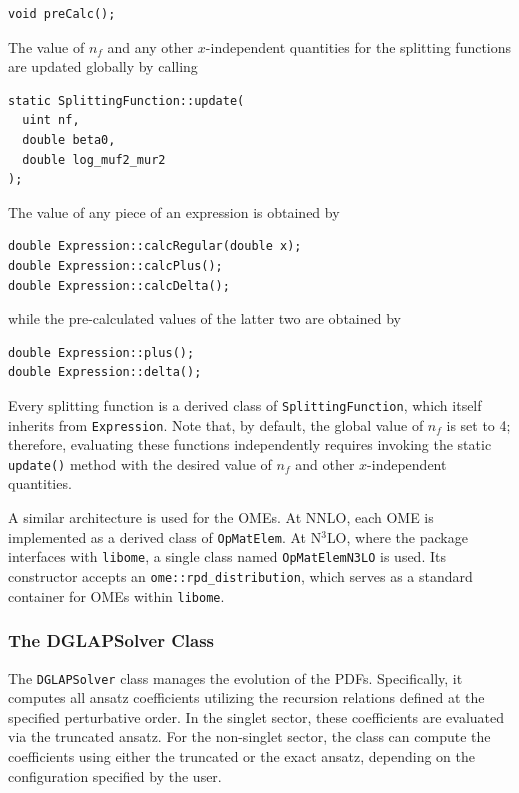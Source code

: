 \documentclass[preprint,12pt]{elsarticle}
\begin{document}
\begin{verbatim}
void preCalc();
\end{verbatim}
The value of $n_f$ and any other $x$-independent quantities for the splitting functions are updated globally by calling

\begin{verbatim}
static SplittingFunction::update(
  uint nf,
  double beta0,
  double log_muf2_mur2
);
\end{verbatim}

The value of any piece of an expression is obtained by

\begin{verbatim}
double Expression::calcRegular(double x);
double Expression::calcPlus();
double Expression::calcDelta();
\end{verbatim}

while the pre-calculated values of the latter two are obtained by 

\begin{verbatim}
double Expression::plus();
double Expression::delta();
\end{verbatim}

Every splitting function is a derived class of \texttt{SplittingFunction}, 
which itself inherits from \texttt{Expression}. Note that, by default, the global 
value of $n_f$ is set to 4; therefore, evaluating these functions independently 
requires invoking the static \texttt{update()} method with the desired 
value of $n_f$ and other $x$-independent quantities.

A similar architecture is used for the OMEs. At NNLO, 
each OME is implemented as a derived class of \texttt{OpMatElem}. At 
N$^3$LO, where the package interfaces with \texttt{libome}, a single class 
named \texttt{OpMatElemN3LO} is used. Its constructor accepts an 
\texttt{ome::rpd_distribution}, which serves as a standard 
container for OMEs within \texttt{libome}.

\subsubsection{The DGLAPSolver Class}
\label{subsec:dglapsolver}

The \texttt{DGLAPSolver} class manages the evolution of the PDFs. 
Specifically, it computes all ansatz coefficients utilizing the recursion 
relations defined at the specified perturbative order. In the singlet 
sector, these coefficients are evaluated via the truncated ansatz. For 
the non-singlet sector, the class can compute the coefficients using 
either the truncated or the exact ansatz, depending on the configuration 
specified by the user.
\end{document}
